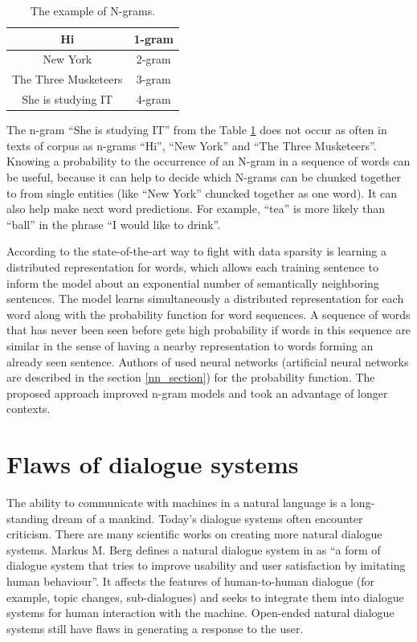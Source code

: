 \begin{table}[ht]
  \centering
   \begin{tabular}{|c|c|} 
   \hline
    Hi & 1-gram \\
   \hline
    New York & 2-gram \\
   \hline
   The Three Musketeers & 3-gram \\
   \hline
   She is studying IT & 4-gram \\
   \hline
   \end{tabular}
   \caption{The example of N-grams.}
  \label{tab:n_gram}
\end{table}

The n-gram ``She is studying IT'' from the Table \ref{tab:n_gram} does not occur as often in texts of corpus as n-grams ``Hi'', ``New York'' and ``The Three Musketeers''. Knowing a probability to the occurrence of an N-gram in a sequence of words can be useful, because it can help to decide which N-grams can be chunked together to from single entities (like ``New York'' chuncked together as one word). It can also help make next word predictions. For example, ``tea'' is more likely than ``ball'' in the phrase ``I would like to drink''.

According to \cite{bengio2003neural} the state-of-the-art way to fight with data sparsity is learning a distributed representation for words, which allows each training sentence to inform the model about an exponential number of semantically neighboring sentences. The model learns simultaneously a distributed representation for each word along with the probability function for word sequences. A sequence of words that has never been seen before gets high probability if words in this sequence are similar in the sense of having a nearby representation to words forming an already seen sentence. Authors of \cite{bengio2003neural} used neural networks (artificial neural networks are described in the section \ref{nn_section}) for the probability function. The proposed approach improved n-gram models and took an advantage of longer contexts.

\section{Flaws of dialogue systems}\label{nlg_ds_problems}
The ability to communicate with machines in a natural language is a long-standing dream of a mankind. Today's dialogue systems often encounter criticism. There are many scientific works on creating more natural dialogue systems. Markus M. Berg defines a natural dialogue system in \cite{berg2014modelling} as ``a form of dialogue system that tries to improve usability and user satisfaction by imitating human behaviour''. It affects the features of human-to-human dialogue (for example, topic changes, sub-dialogues) and seeks to integrate them into dialogue systems for human interaction with the machine. Open-ended natural dialogue systems still have flaws in generating a response to the user.

